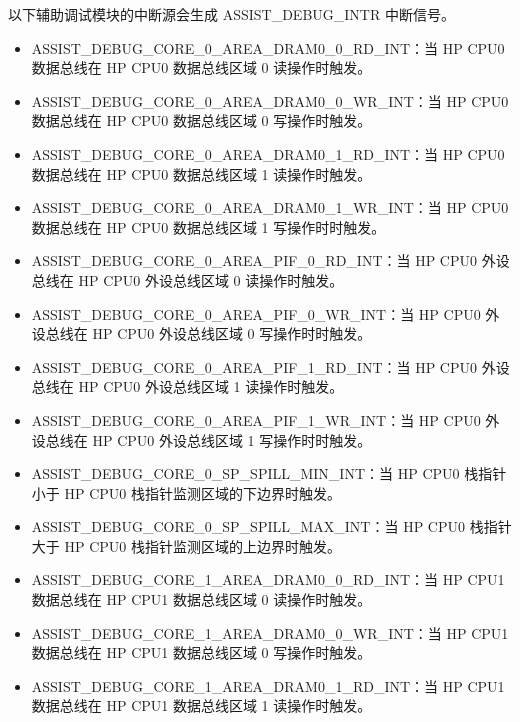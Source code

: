 \documentclass[main\_\_CN.tex]{subfiles}
\begin{document}
以下辅助调试模块的中断源会生成 ASSIST\_DEBUG\_INTR 中断信号。

\begin{itemize}
\item \label{int:ASSISTDEBUGCORE0AREADRAM00RDINT}ASSIST\_DEBUG\_CORE\_0\_AREA\_DRAM0\_0\_RD\_INT：当 HP CPU0 数据总线在 HP CPU0 数据总线区域 0 读操作时触发。
\item \label{int:ASSISTDEBUGCORE0AREADRAM00WRINT}ASSIST\_DEBUG\_CORE\_0\_AREA\_DRAM0\_0\_WR\_INT：当 HP CPU0 数据总线在 HP CPU0 数据总线区域 0 写操作时触发。
\item \label{int:ASSISTDEBUGCORE0AREADRAM01RDINT}ASSIST\_DEBUG\_CORE\_0\_AREA\_DRAM0\_1\_RD\_INT：当 HP CPU0 数据总线在 HP CPU0 数据总线区域 1 读操作时触发。
\item \label{int:ASSISTDEBUGCORE0AREADRAM01WRINT}ASSIST\_DEBUG\_CORE\_0\_AREA\_DRAM0\_1\_WR\_INT：当 HP CPU0 数据总线在 HP CPU0 数据总线区域 1 写操作时时触发。
\item \label{int:ASSISTDEBUGCORE0AREAPIF0RDINT}ASSIST\_DEBUG\_CORE\_0\_AREA\_PIF\_0\_RD\_INT：当 HP CPU0 外设总线在 HP CPU0 外设总线区域 0 读操作时触发。
\item \label{int:ASSISTDEBUGCORE0AREAPIF0WRINT}ASSIST\_DEBUG\_CORE\_0\_AREA\_PIF\_0\_WR\_INT：当 HP CPU0 外设总线在 HP CPU0 外设总线区域 0 写操作时时触发。
\item \label{int:ASSISTDEBUGCORE0AREAPIF1RDINT}ASSIST\_DEBUG\_CORE\_0\_AREA\_PIF\_1\_RD\_INT：当 HP CPU0 外设总线在 HP CPU0 外设总线区域 1 读操作时触发。
\item \label{int:ASSISTDEBUGCORE0AREAPIF1WRINT}ASSIST\_DEBUG\_CORE\_0\_AREA\_PIF\_1\_WR\_INT：当 HP CPU0 外设总线在 HP CPU0 外设总线区域 1 写操作时时触发。
\item
\label{int:ASSISTDEBUGCORE0SPSPILLMININT}ASSIST\_DEBUG\_CORE\_0\_SP\_SPILL\_MIN\_INT：当 HP CPU0 栈指针小于 HP CPU0 栈指针监测区域的下边界时触发。
\item
\label{int:ASSISTDEBUGCORE0SPSPILLMAXINT}ASSIST\_DEBUG\_CORE\_0\_SP\_SPILL\_MAX\_INT：当 HP CPU0 栈指针大于 HP CPU0 栈指针监测区域的上边界时触发。
\item \label{int:ASSISTDEBUGCORE1AREADRAM00RDINT}ASSIST\_DEBUG\_CORE\_1\_AREA\_DRAM0\_0\_RD\_INT：当 HP CPU1 数据总线在 HP CPU1 数据总线区域 0 读操作时触发。
\item \label{int:ASSISTDEBUGCORE1AREADRAM00WRINT}ASSIST\_DEBUG\_CORE\_1\_AREA\_DRAM0\_0\_WR\_INT：当 HP CPU1 数据总线在 HP CPU1 数据总线区域 0 写操作时触发。
\item \label{int:ASSISTDEBUGCORE1AREADRAM01RDINT}ASSIST\_DEBUG\_CORE\_1\_AREA\_DRAM0\_1\_RD\_INT：当 HP CPU1 数据总线在 HP CPU1 数据总线区域 1 读操作时触发。

\end{itemize}
\end{document}
